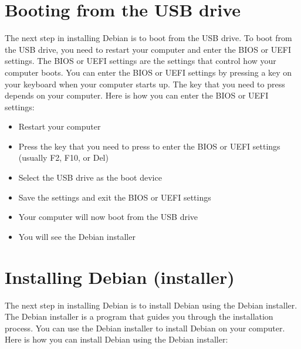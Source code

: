 \section{Booting from the USB drive}

The next step in installing Debian is to boot from the USB drive. To boot from the USB drive, you need to restart your computer and enter the BIOS or UEFI settings. The BIOS or UEFI settings are the settings that control how your computer boots. You can enter the BIOS or UEFI settings by pressing a key on your keyboard when your computer starts up. The key that you need to press depends on your computer. Here is how you can enter the BIOS or UEFI settings:

\begin{itemize}
    \item Restart your computer
    \item Press the key that you need to press to enter the BIOS or UEFI settings (usually F2, F10, or Del)
    \item Select the USB drive as the boot device
    \item Save the settings and exit the BIOS or UEFI settings
    \item Your computer will now boot from the USB drive
    \item You will see the Debian installer
\end{itemize}

\section{Installing Debian (installer)}

The next step in installing Debian is to install Debian using the Debian installer. The Debian installer is a program that guides you through the installation process. You can use the Debian installer to install Debian on your computer. Here is how you can install Debian using the Debian installer:


